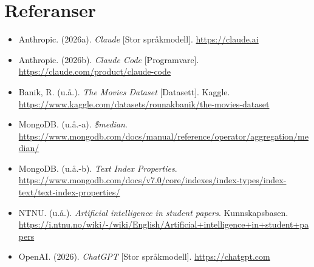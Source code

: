 \documentclass[11pt,a4paper]{article}
\begin{document}
\section*{Referanser}
\begin{itemize}[label={}, leftmargin=1.5em, itemindent=-1.5em, itemsep=3pt]
  \item Anthropic. (2026a). \textit{Claude} [Stor språkmodell]. \url{https://claude.ai}
  \item Anthropic. (2026b). \textit{Claude Code} [Programvare]. \url{https://claude.com/product/claude-code}
  \item Banik, R. (u.å.). \textit{The Movies Dataset} [Datasett]. Kaggle. \url{https://www.kaggle.com/datasets/rounakbanik/the-movies-dataset}
  \item MongoDB. (u.å.-a). \textit{\$median}. \url{https://www.mongodb.com/docs/manual/reference/operator/aggregation/median/}
  \item MongoDB. (u.å.-b). \textit{Text Index Properties}. \url{https://www.mongodb.com/docs/v7.0/core/indexes/index-types/index-text/text-index-properties/}
  \item NTNU. (u.å.). \textit{Artificial intelligence in student papers}. Kunnskapsbasen. \url{https://i.ntnu.no/wiki/-/wiki/English/Artificial+intelligence+in+student+papers}
  \item OpenAI. (2026). \textit{ChatGPT} [Stor språkmodell]. \url{https://chatgpt.com}
\end{itemize}

\end{document}
